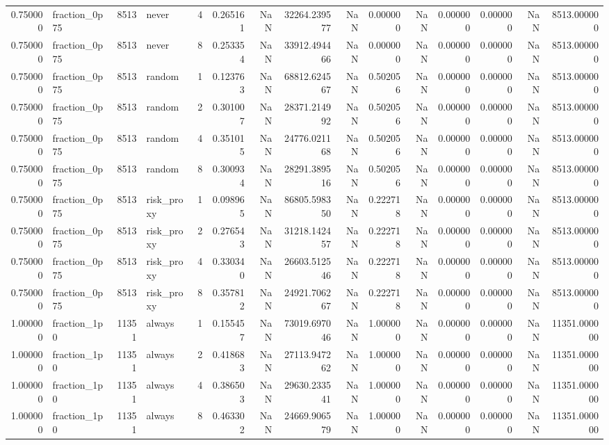 \begin{tabular}{rlrlrrrrrrrrrrr}
0.750000 & fraction\_0p75 & 8513 & never & 4 & 0.265161 & NaN & 32264.239577 & NaN & 0.000000 & NaN & 0.000000 & 0.000000 & NaN & 8513.000000 \\
0.750000 & fraction\_0p75 & 8513 & never & 8 & 0.253354 & NaN & 33912.494466 & NaN & 0.000000 & NaN & 0.000000 & 0.000000 & NaN & 8513.000000 \\
0.750000 & fraction\_0p75 & 8513 & random & 1 & 0.123763 & NaN & 68812.624567 & NaN & 0.502056 & NaN & 0.000000 & 0.000000 & NaN & 8513.000000 \\
0.750000 & fraction\_0p75 & 8513 & random & 2 & 0.301007 & NaN & 28371.214992 & NaN & 0.502056 & NaN & 0.000000 & 0.000000 & NaN & 8513.000000 \\
0.750000 & fraction\_0p75 & 8513 & random & 4 & 0.351015 & NaN & 24776.021168 & NaN & 0.502056 & NaN & 0.000000 & 0.000000 & NaN & 8513.000000 \\
0.750000 & fraction\_0p75 & 8513 & random & 8 & 0.300934 & NaN & 28291.389516 & NaN & 0.502056 & NaN & 0.000000 & 0.000000 & NaN & 8513.000000 \\
0.750000 & fraction\_0p75 & 8513 & risk\_proxy & 1 & 0.098965 & NaN & 86805.598350 & NaN & 0.222718 & NaN & 0.000000 & 0.000000 & NaN & 8513.000000 \\
0.750000 & fraction\_0p75 & 8513 & risk\_proxy & 2 & 0.276543 & NaN & 31218.142457 & NaN & 0.222718 & NaN & 0.000000 & 0.000000 & NaN & 8513.000000 \\
0.750000 & fraction\_0p75 & 8513 & risk\_proxy & 4 & 0.330340 & NaN & 26603.512546 & NaN & 0.222718 & NaN & 0.000000 & 0.000000 & NaN & 8513.000000 \\
0.750000 & fraction\_0p75 & 8513 & risk\_proxy & 8 & 0.357812 & NaN & 24921.706267 & NaN & 0.222718 & NaN & 0.000000 & 0.000000 & NaN & 8513.000000 \\
1.000000 & fraction\_1p0 & 11351 & always & 1 & 0.155457 & NaN & 73019.697046 & NaN & 1.000000 & NaN & 0.000000 & 0.000000 & NaN & 11351.000000 \\
1.000000 & fraction\_1p0 & 11351 & always & 2 & 0.418683 & NaN & 27113.947262 & NaN & 1.000000 & NaN & 0.000000 & 0.000000 & NaN & 11351.000000 \\
1.000000 & fraction\_1p0 & 11351 & always & 4 & 0.386503 & NaN & 29630.233541 & NaN & 1.000000 & NaN & 0.000000 & 0.000000 & NaN & 11351.000000 \\
1.000000 & fraction\_1p0 & 11351 & always & 8 & 0.463302 & NaN & 24669.906579 & NaN & 1.000000 & NaN & 0.000000 & 0.000000 & NaN & 11351.000000 \\

\end{tabular}
